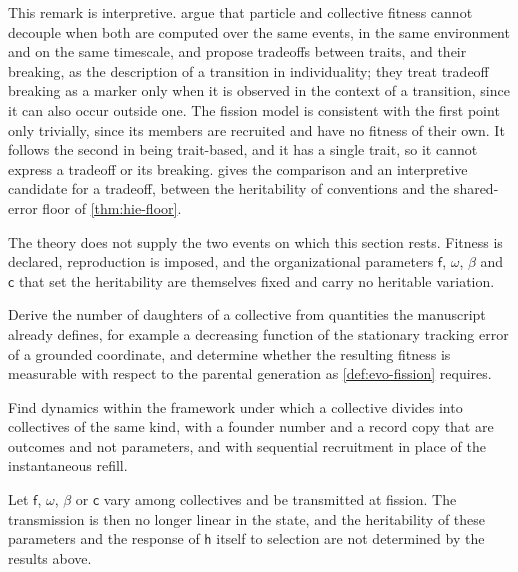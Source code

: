 \begin{remark}\label{rem:evo-bourrat}
This remark is interpretive. \citet{bourrat2022tradeoff} argue that particle and collective fitness cannot decouple when both are computed over the same events, in the same environment and on the same timescale, and propose tradeoffs between traits, and their breaking, as the description of a transition in individuality; they treat tradeoff breaking as a marker only when it is observed in the context of a transition, since it can also occur outside one. The fission model is consistent with the first point only trivially, since its members are recruited and have no fitness of their own. It follows the second in being trait-based, and it has a single trait, so it cannot express a tradeoff or its breaking.  gives the comparison and an interpretive candidate for a tradeoff, between the heritability of conventions and the shared-error floor of \cref{thm:hie-floor}.
\end{remark}

The theory does not supply the two events on which this section rests. Fitness is declared, reproduction is imposed, and the organizational parameters $\mathsf f$, $\omega$, $\beta$ and $\mathsf c$ that set the heritability are themselves fixed and carry no heritable variation.

\begin{openproblem}\label{open:evo-fitness}
Derive the number of daughters of a collective from quantities the manuscript already defines, for example a decreasing function of the stationary tracking error of a grounded coordinate, and determine whether the resulting fitness is measurable with respect to the parental generation as \cref{def:evo-fission} requires.
\end{openproblem}

\begin{openproblem}\label{open:evo-reproduction}
Find dynamics within the framework under which a collective divides into collectives of the same kind, with a founder number and a record copy that are outcomes and not parameters, and with sequential recruitment in place of the instantaneous refill.
\end{openproblem}

\begin{openproblem}\label{open:evo-parameters}
Let $\mathsf f$, $\omega$, $\beta$ or $\mathsf c$ vary among collectives and be transmitted at fission. The transmission is then no longer linear in the state, and the heritability of these parameters and the response of $\mathsf h$ itself to selection are not determined by the results above.
\end{openproblem}

